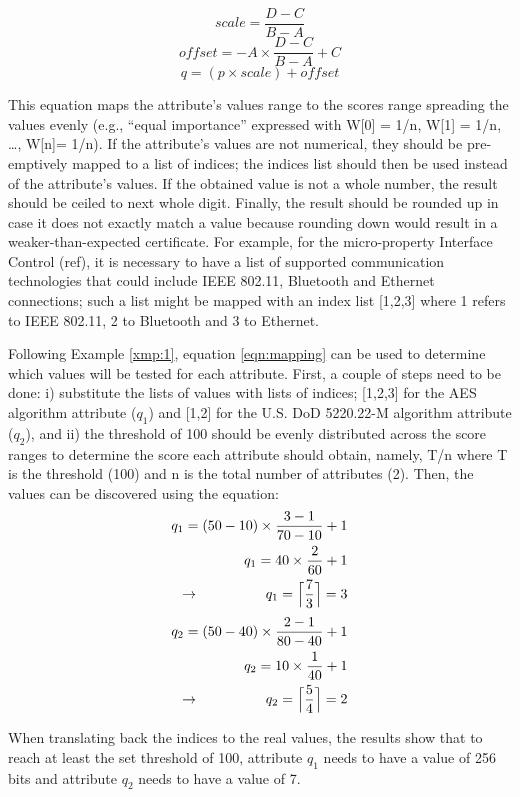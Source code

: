 \[scale = \frac{D - C }{B - A}\]
\[offset = -A \times \frac{D - C}{B - A} + C\]
\[q = \left ( p \times scale \right ) + offset\]


This equation maps the attribute's values range to the scores range spreading the values evenly (e.g., “equal importance” expressed with W[0] = 1/n, W[1] = 1/n, \dots , W[n]= 1/n). If the attribute's values are not numerical, they should be pre-emptively mapped to a list of indices; the indices list should then be used instead of the attribute's values. If the obtained value is not a whole number, the result should be ceiled to next whole digit. Finally, the result should be rounded up in case it does not exactly match a value because rounding down would result in a weaker-than-expected certificate. For example, for the micro-property Interface Control (ref), it is necessary to have a list of supported communication technologies that could include IEEE 802.11, Bluetooth and Ethernet connections; such a list might be mapped with an index list [1,2,3] where 1 refers to IEEE 802.11, 2 to Bluetooth and 3 to Ethernet.


\begin{example}
Following Example \ref{xmp:1}, equation \ref{eqn:mapping} can be used to determine which values will be tested for each attribute. First, a couple of steps need to be done: i) substitute the lists of values with lists of indices; [1,2,3] for the AES algorithm attribute (\(q_1\)) and [1,2] for the U.S. DoD 5220.22-M algorithm attribute (\(q_2\)), and ii) the threshold of 100 should be evenly distributed across the score ranges to determine the score each attribute should obtain, namely, T/n where T is the threshold (100) and n is the total number of attributes (2). Then, the values can be discovered using the equation:
\begin{align*}
  q_1 = (50 - 10) \times \frac{3 - 1}{70 - 10} + 1\\
  q_1 = 40 \times \frac{2}{60} + 1 \\
  \llap{$\rightarrow$\hspace{50pt}} q_1 = \Bigl\lceil\frac{7}{3}\Bigr\rceil = 3
\end{align*}
\begin{align*}
  q_2 = (50 - 40) \times \frac{2 - 1}{80 - 40} + 1\\
  q_2 = 10 \times \frac{1}{40} + 1 \\
  \llap{$\rightarrow$\hspace{50pt}} q_2 = \Bigl\lceil\frac{5}{4}\Bigr\rceil = 2
\end{align*}

When translating back the indices to the real values, the results show that to reach at least the set threshold of 100, attribute \(q_1\) needs to have a value of 256 bits and attribute \(q_2\) needs to have a value of 7.
\end{example}

